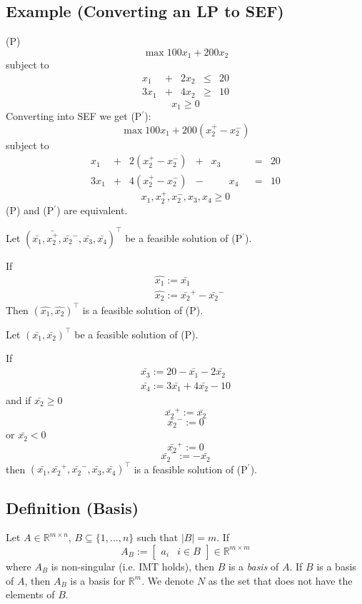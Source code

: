\subsection{Example (Converting an LP to SEF)}
(P)
\[\max 100x_1+200x_2\]
subject to
\[
\begin{array}{ccccc}
    x_1 & + & 2x_2 & \le & 20\\
    3x_1 & + & 4x_2 & \ge & 10
\end{array}
\]
\[x_1 \ge 0\]
Converting into SEF we get (P$^\prime$):
\[\max 100x_1+200(x_2^+-x_2^-)\]
subject to
\[
\begin{array}{ccccccccc}
    x_1 & + & 2(x_2^+-x_2^-) & + & x_3 & & & = & 20\\
    3x_1 & + & 4(x_2^+-x_2^-) & - & & x_4 & & = & 10
\end{array}
\]
\[x_1,x_2^+,x_2^-,x_3,x_4\ge 0\]
(P) and (P$^\prime$) are equivalent.

Let
$(\bar{x_1}, \bar{x_2^+}, \bar{x_2}^-, \bar{x_3}, \bar{x_4})^\top$
be a feasible solution of (P$^\prime$).


If
\begin{align*}
    &\hat{x_1}:=\bar{x_1}\\
    &\hat{x_2}:=\bar{x_2}^+-\bar{x_2}^-
\end{align*}
Then 
$(\hat{x_1},\hat{x_2})^\top$
is a feasible solution of (P).

Let
$(\bar{x_1}, \bar{x_2})^\top$
be a feasible solution of (P).

If
\begin{align*}
    \bar{x_3}:=20-\bar{x_1}-2\bar{x_2}\\
    \bar{x_4}:=3\bar{x_1}+4\bar{x_2}-10
\end{align*}
and 
if $\bar{x_2}\ge 0$
\[\bar{x_2}^+:=\bar{x_2}\]
\[\bar{x_2}^-:=0\]
or $\bar{x_2}< 0$
\[\bar{x_2}^+:=0\]
\[\bar{x_2}^-:=-\bar{x_2}\]
then $(\bar{x_1},\bar{x_2}^+,\bar{x_2}^-,\bar{x_3},\bar{x_4})^\top$
is a feasible solution of (P$^\prime$).

\begin{defbox}
    \subsection{Definition (Basis)}
    Let $A\in \mathbb{R}^{m\times n}$, $B\subseteq\{1,\dots,n\}$ such that $|B|=m$. If
    \[A_B:= \left[\begin{array}{c|c} a_i & i\in B \end{array}\right]
        \in \mathbb{R}^{m\times m}
    \]
    where $A_B$ is non-singular (i.e. IMT holds), then $B$ is a \emph{basis} of $A$.
    If $B$ is a basis of $A$, then $A_B$ is a basis for $\mathbb{R}^m$. We
    denote $N$ as the set that does not have the elements of $B$.
\end{defbox}


